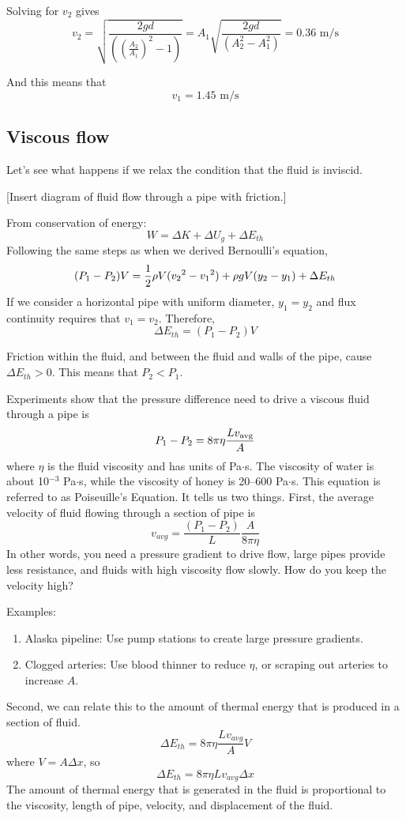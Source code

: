 Solving for $v_2$ gives
$$\boxed{v_2=\sqrt{\frac{2gd}{\left(\left(\frac{A_2}{A_1}\right)^2-1\right)}}=A_1\sqrt{\frac{2gd}{\left(A_2^2-A_1^2\right)}}=0.36\mbox{ m/s}}$$

And this means that
$$\boxed{v_1=1.45\mbox{ m/s}}$$

\subsection{Viscous flow}
Let's see what happens if we relax the condition that the fluid is inviscid.

[Insert diagram of fluid flow through a pipe with friction.]
\vspace{5cm}

From conservation of energy:
$$W=\Delta{K}+\Delta{U_g}+\Delta{E_{th}}$$
Following the same steps as when we derived Bernoulli's equation,
$$(P_1-P_2)V=\frac{1}{2}\rho V(v_2\displaystyle^2-v_1\displaystyle^2)+\rho gV(y_2-y_1)+\Delta{E_{th}}$$
If we consider a horizontal pipe with uniform diameter, $y_1=y_2$ and flux continuity requires that $v_1=v_2$. Therefore,
$$\Delta{E_{th}}=(P_1-P_2)V$$

Friction within the fluid, and between the fluid and walls of the pipe, cause $\Delta E_{th}>0$. This means that $P_2<P_1$.

Experiments show that the pressure difference need to drive a viscous fluid through a pipe is
$$P_1-P_2=8\pi\eta\frac{Lv_{\rm avg}}{A}$$
where $\eta$ is the fluid viscosity and has units of Pa$\cdot$s. The viscosity of water is about 10$^{-3}$ Pa$\cdot$s, while the viscosity of honey is 20--600 Pa$\cdot$s. This equation is referred to as Poiseuille's Equation. It tells us two things. First, the average velocity of fluid flowing through a section of pipe is 
$$v_{avg}=\frac{(P_1-P_2)}{L}\frac{A}{8\pi\eta}$$
In other words, you need a pressure gradient to drive flow, large pipes provide less resistance, and fluids with high viscosity flow slowly. How do you keep the velocity high?

Examples:
\begin{enumerate}
\item Alaska pipeline: Use pump stations to create large pressure gradients.
\item Clogged arteries: Use blood thinner to reduce $\eta$, or scraping out arteries to increase $A$.
\end{enumerate}

Second, we can relate this to the amount of thermal energy that is produced in a section of fluid.
$$\Delta E_{th}=8\pi\eta\frac{Lv_{avg}}{A}{V}$$
where $V=A\Delta x$, so
$$\Delta E_{th}=8\pi\eta Lv_{avg}\Delta{x}$$
The amount of thermal energy that is generated in the fluid is proportional to the viscosity, length of pipe, velocity, and displacement of the fluid.

